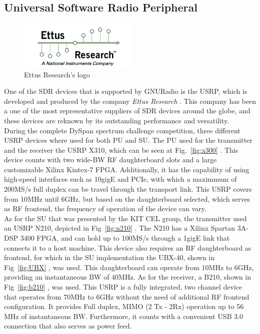 \subsection{Universal Software Radio Peripheral}
\begin{figure}[htb]
    \centering
      \includegraphics[width=0.5\textwidth]{figures/ettus_logo}
      \caption{Ettus Research's logo}
      \label{fig:ettus}
\end{figure}

One of the \ac{SDR} devices that is supported by GNURadio is the \ac{USRP}, which is developed and produced by the company \emph{Ettus Research\texttrademark} \cite{Ettus}. This company has been a one of the most representative suppliers of \ac{SDR} devices around the globe, and these devices are reknown by its outstanding performance and versatility.\\

During the complete \ac{DySpan} spectrum challenge competition, three different \ac{USRP} devices where used for both \ac{PU} and \ac{SU}. The \ac{PU} used for the transmitter and the receiver the \ac{USRP} X310, which can be seen at Fig.~\ref{fig:x300} \cite{X300}. This device counts with two wide-\ac{BW} \ac{RF} daughterboard slots and a large customizable Xilinx Kintex-7 FPGA. Additionally, it has the capability of using high-speed interfaces such as 10gigE and PCIe, with which a maximmum of 200MS/s full duplex can be travel through the transport link. This \ac{USRP} covers from 10MHz until 6GHz, but based on the daughterboard selected, which serves as \ac{RF} frontend, the frequency of operation of the device can vary.\\

As for the \ac{SU} that was presented by the \ac{KIT} \ac{CEL} group, the transmitter used an \ac{USRP} N210, depicted in Fig~\ref{fig:n210} \cite{N210}. The N210 has a Xilinx Spartan 3A-DSP 3400 FPGA, and can hold up to 100MS/s through a 1gigE link that connects it to a host machine.  This device also requires an \ac{RF} daughterboard as frontend, for which in the \ac{SU} implementation the UBX-40, shown in Fig~\ref{fig:UBX} \cite{UBX}, was used. This daughterboard can operate from 10MHz to 6GHz, providing an instantaneous \ac{BW} of 40MHz. As for the receiver, a B210, shown in Fig~\ref{fig:b210} \cite{B210}, was used. This \ac{USRP} is a fully integrated, two channel device that operates from 70MHz to 6GHz without the need of additional \ac{RF} frontend configuration. It provides Full duplex, MIMO (2 Tx - 2Rx) operation up to 56 MHz of instantaneous \ac{BW}. Furthermore, it counts with a convenient USB 3.0 connection that also serves as power feed.\\


